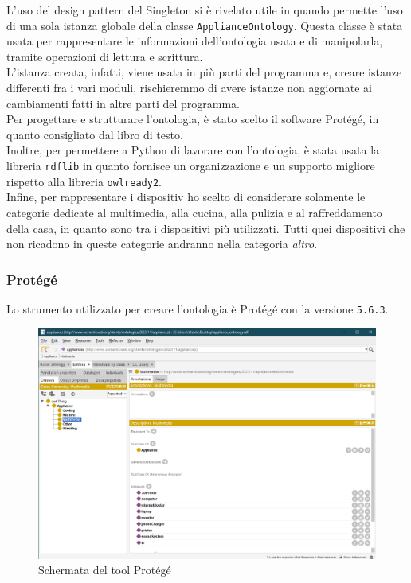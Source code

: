 \documentclass[12pt, letterpaper]{article}
\begin{document}
\noindent L'uso del design pattern del Singleton si è rivelato utile in quando permette l'uso di
una sola istanza globale della classe \texttt{ApplianceOntology}. Questa classe è stata usata per
rappresentare le informazioni dell'ontologia usata e di manipolarla, tramite operazioni di lettura e
scrittura. \\

\noindent L'istanza creata, infatti, viene usata in più parti del programma e, creare istanze differenti
fra i vari moduli, rischieremmo di avere istanze non aggiornate ai cambiamenti fatti in altre parti del
programma. \\

\noindent Per progettare e strutturare l'ontologia, è stato scelto il software Protégé, in quanto
consigliato dal libro di testo. \\

\noindent Inoltre, per permettere a Python di lavorare con l'ontologia, è stata usata la libreria \texttt{rdflib}
in quanto fornisce un organizzazione e un supporto migliore rispetto alla libreria \texttt{owlready2}. \\

\noindent Infine, per rappresentare i dispositiv ho scelto di considerare solamente le categorie dedicate al
multimedia, alla cucina, alla pulizia e al raffreddamento della casa, in quanto sono tra i dispositivi più
utilizzati. Tutti quei dispositivi che non ricadono in queste categorie andranno nella
categoria \textit{altro}.

\subsubsection{Protégé}

Lo strumento utilizzato per creare l'ontologia è Protégé \cite{protege} con la versione
\texttt{5.6.3}.

\begin{figure}[h]
      \centering
      \includegraphics[scale=0.4]{protege-home.png}
      \caption{Schermata del tool Protégé}
\end{figure}
\end{document}
